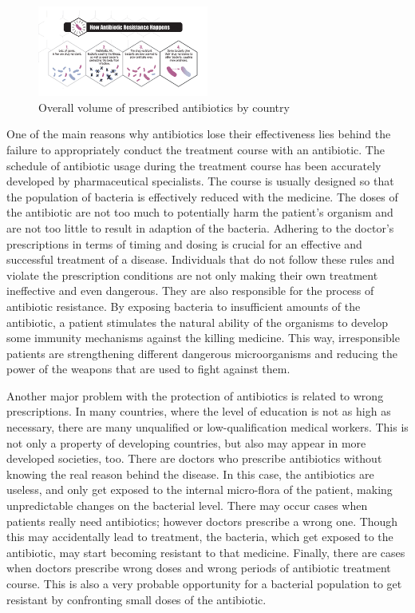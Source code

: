 \begin{figure}[H]
  \centering
  \includegraphics[width=0.5\textwidth]{img/Fig3}
  \caption{Overall volume of prescribed antibiotics by country}
  \label{fig3}
\end{figure}

One of the main reasons why antibiotics lose their effectiveness lies behind the failure to appropriately conduct the treatment course with an antibiotic. The schedule of antibiotic usage during the treatment course has been accurately developed by pharmaceutical specialists. The course is usually designed so that the population of bacteria is effectively reduced with the medicine. The doses of the antibiotic are not too much to potentially harm the patient’s organism and are not too little to result in adaption of the bacteria. Adhering to the doctor’s prescriptions in terms of timing and dosing is crucial for an effective and successful treatment of a disease. Individuals that do not follow these rules and violate the prescription conditions are not only making their own treatment ineffective and even dangerous. They are also responsible for the process of antibiotic resistance. By exposing bacteria to insufficient amounts of the antibiotic, a patient stimulates the natural ability of the organisms to develop some immunity mechanisms against the killing medicine. This way, irresponsible patients are strengthening different dangerous microorganisms and reducing the power of the weapons that are used to fight against them.

Another major problem with the protection of antibiotics is related to wrong prescriptions. In many countries, where the level of education is not as high as necessary, there are many unqualified or low-qualification medical workers. This is not only a property of developing countries, but also may appear in more developed societies, too. There are doctors who prescribe antibiotics without knowing the real reason behind the disease. In this case, the antibiotics are useless, and only get exposed to the internal micro-flora of the patient, making unpredictable changes on the bacterial level. There may occur cases when patients really need antibiotics; however doctors prescribe a wrong one. Though this may accidentally lead to treatment, the bacteria, which get exposed to the antibiotic, may start becoming resistant to that medicine. Finally, there are cases when doctors prescribe wrong doses and wrong periods of antibiotic treatment course. This is also a very probable opportunity for a bacterial population to get resistant by confronting small doses of the antibiotic.

